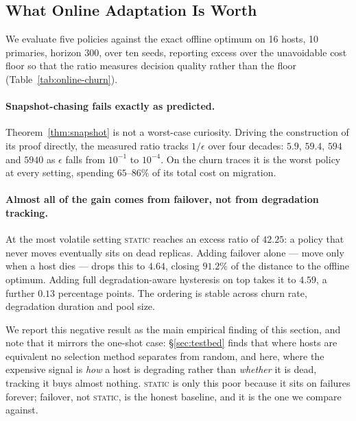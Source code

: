 \subsection{What Online Adaptation Is Worth}
\label{sec:online:results}

We evaluate five policies against the exact offline optimum on 16 hosts, 10
primaries, horizon 300, over ten seeds, reporting excess over the unavoidable
cost floor so that the ratio measures decision quality rather than the floor
(Table~\ref{tab:online-churn}).

\paragraph{Snapshot-chasing fails exactly as predicted.} Theorem~\ref{thm:snapshot}
is not a worst-case curiosity. Driving the construction of its proof directly,
the measured ratio tracks $1/\epsilon$ over four decades: $5.9$, $59.4$, $594$
and $5940$ as $\epsilon$ falls from $10^{-1}$ to $10^{-4}$. On the churn traces
it is the worst policy at every setting, spending $65$--$86\%$ of its total cost
on migration.

\paragraph{Almost all of the gain comes from failover, not from degradation
tracking.} At the most volatile setting \textsc{static} reaches an excess ratio
of $42.25$: a policy that never moves eventually sits on dead replicas. Adding
failover alone --- move only when a host dies --- drops this to $4.64$, closing
$91.2\%$ of the distance to the offline optimum. Adding full degradation-aware
hysteresis on top takes it to $4.59$, a further $0.13$ percentage points. The
ordering is stable across churn rate, degradation duration and pool size.

We report this negative result as the main empirical finding of this section,
and note that it mirrors the one-shot case: \S\ref{sec:testbed} finds that where
hosts are equivalent no selection method separates from random, and here, where
the expensive signal is \emph{how} a host is degrading rather than \emph{whether}
it is dead, tracking it buys almost nothing. \textsc{static} is only this poor
because it sits on failures forever; failover, not \textsc{static}, is the
honest baseline, and it is the one we compare against.

